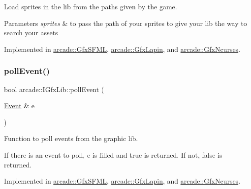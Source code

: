 Load sprites in the lib from the paths given by the game. 


\begin{DoxyParams}{Parameters}
{\em sprites} & to pass the path of your sprites to give your lib the way to search your assets \\
\hline
\end{DoxyParams}


Implemented in \hyperlink{classarcade_1_1_gfx_s_f_m_l_a1e586ce151c47e3b5a6abcfdf5ecdc79}{arcade\+::\+Gfx\+S\+F\+ML}, \hyperlink{classarcade_1_1_gfx_lapin_a164a694063507041dbd78415898d5157}{arcade\+::\+Gfx\+Lapin}, and \hyperlink{classarcade_1_1_gfx_ncurses_a6a412ec8047964035f0d75e64fd8dc44}{arcade\+::\+Gfx\+Ncurses}.

\mbox{\label{classarcade_1_1_i_gfx_lib_a82cdd82f168ca898ef81edf82ca6147a}} 
\subsubsection{\texorpdfstring{poll\+Event()}{pollEvent()}}
{\footnotesize\ttfamily bool arcade\+::\+I\+Gfx\+Lib\+::poll\+Event (\begin{DoxyParamCaption}\item[{\hyperlink{structarcade_1_1_event}{Event} \&}]{e }\end{DoxyParamCaption})\hspace{0.3cm}{\ttfamily [pure virtual]}}



Function to poll events from the graphic lib. 

If there is an event to poll, e is filled and true is returned. If not, false is returned. 

Implemented in \hyperlink{classarcade_1_1_gfx_s_f_m_l_a7c2d800770d4218eb38c8b01f5890aa3}{arcade\+::\+Gfx\+S\+F\+ML}, \hyperlink{classarcade_1_1_gfx_lapin_a80f4cae576f05ddc8ab94d5a348226c5}{arcade\+::\+Gfx\+Lapin}, and \hyperlink{classarcade_1_1_gfx_ncurses_aa16f7c823041b931025f750b4050318a}{arcade\+::\+Gfx\+Ncurses}.

\mbox{\label{classarcade_1_1_i_gfx_lib_a0b965ed555739ef366b27583799d794c}} 
